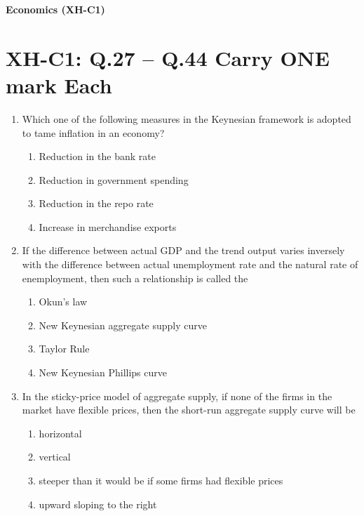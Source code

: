 \documentclass{article}
\begin{document}
\maketitle
\noindent \textbf{Economics (XH-C1)}
\section*{XH-C1: Q.27 – Q.44 Carry ONE mark Each}
\begin{enumerate}[leftmargin=*, start=27, label=Q.\arabic*.]

    \item Which one of the following measures in the Keynesian framework is adopted to tame inflation in an economy?

    \begin{multicols}{2}
    \begin{enumerate}
        \item Reduction in the bank rate 
        \item Reduction in government spending
        \item Reduction in the repo rate
        \item Increase in merchandise exports
    \end{enumerate}
    \end{multicols}

    \item If the difference between actual GDP and the trend output varies inversely with the difference between actual unemployment rate and the natural rate of enemployment, then such a relationship is called the

    \begin{multicols}{2}
    \begin{enumerate}
        \item Okun’s law
        \item New Keynesian aggregate supply curve
        \item Taylor Rule
        \item New Keynesian Phillips curve
    \end{enumerate}
    \end{multicols}

    \item In the sticky-price model of aggregate supply, if none of the firms in the market have flexible prices, then the short-run aggregate supply curve will be
    
    \begin{enumerate}
        \item horizontal
        \item vertical 
        \item steeper than it would be if some firms had flexible prices
        \item upward sloping to the right
    \end{enumerate}


\end{enumerate}
\end{document}
